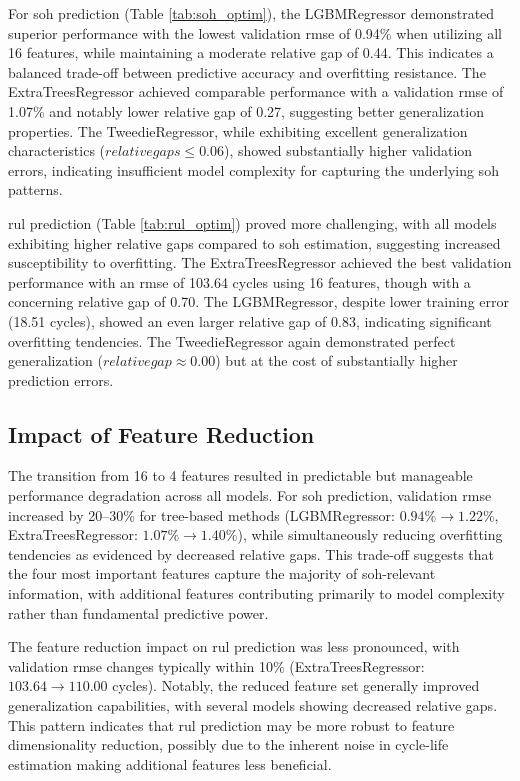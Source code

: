 For \ac{soh} prediction (Table \ref{tab:soh_optim}), the LGBMRegressor demonstrated superior performance with the lowest validation \ac{rmse} of 0.94\% when utilizing all 16 features, while maintaining a moderate relative gap of 0.44. This indicates a balanced trade-off between predictive accuracy and overfitting resistance. The ExtraTreesRegressor achieved comparable performance with a validation \ac{rmse} of 1.07\% and notably lower relative gap of 0.27, suggesting better generalization properties. The TweedieRegressor, while exhibiting excellent generalization characteristics ($relative gaps \leq 0.06$), showed substantially higher validation errors, indicating insufficient model complexity for capturing the underlying \ac{soh} patterns.

\ac{rul} prediction (Table \ref{tab:rul_optim}) proved more challenging, with all models exhibiting higher relative gaps compared to \ac{soh} estimation, suggesting increased susceptibility to overfitting. The ExtraTreesRegressor achieved the best validation performance with an \ac{rmse} of 103.64 cycles using 16 features, though with a concerning relative gap of 0.70. The LGBMRegressor, despite lower training error (18.51 cycles), showed an even larger relative gap of 0.83, indicating significant overfitting tendencies. The TweedieRegressor again demonstrated perfect generalization ($relative gap \approx 0.00$) but at the cost of substantially higher prediction errors.

\subsection{Impact of Feature Reduction}
The transition from 16 to 4 features resulted in predictable but manageable performance degradation across all models. For \ac{soh} prediction, validation \ac{rmse} increased by 20--30\% for tree-based methods (LGBMRegressor: $0.94\% \rightarrow 1.22\%$, ExtraTreesRegressor: $1.07\% \rightarrow
1.40\%$), while simultaneously reducing overfitting tendencies as evidenced by decreased relative gaps. This trade-off suggests that the four most important features capture the majority of \ac{soh}-relevant information, with additional features contributing primarily to model complexity rather than fundamental predictive power.

The feature reduction impact on \ac{rul} prediction was less pronounced, with validation \ac{rmse} changes typically within 10\% (ExtraTreesRegressor: $103.64 \rightarrow 110.00$ cycles). Notably, the reduced feature set generally improved generalization capabilities, with several models showing decreased relative gaps. This pattern indicates that \ac{rul} prediction may be more robust to feature dimensionality reduction, possibly due to the inherent noise in cycle-life estimation making additional features less beneficial.

